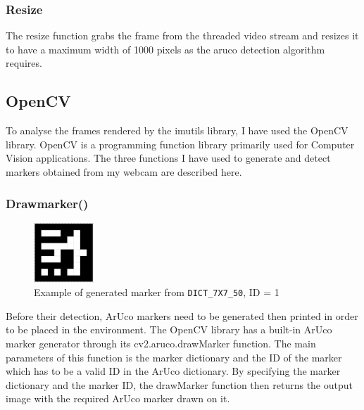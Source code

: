 \documentclass[oneside,%
                    author={Malak Hajji},
                    degree={BSc},
                    title={Designing An Accessible Computational Toolkit For Students},
                  subtitle={With Mixed Visual Abilities}]{dissertation}
\begin{document}
\subsubsection{Resize}
The resize function grabs the frame from the threaded video stream and resizes it to have a maximum width of 1000 pixels as the aruco detection algorithm requires.

\subsection{OpenCV}
To analyse the frames rendered by the imutils library, I have used the OpenCV library. OpenCV is a programming function library primarily used for Computer Vision applications. The three functions I have used to generate and detect markers obtained from my webcam are described here. 

\subsubsection{Drawmarker()}
\FloatBarrier
\begin{figure}[h]
    \centering
    \includegraphics[width=0.2\textwidth]{thesis/marker.eps}
    \caption{Example of generated marker from  \texttt{DICT\_7X7\_50}, ID = 1}
    \label{fig-marker}
\end{figure}
\FloatBarrier
Before their detection, ArUco markers need to be generated then printed in order to be placed in the environment. The OpenCV library has a built-in ArUco marker generator through its cv2.aruco.drawMarker function. The main parameters of this function is the marker dictionary and the ID of the marker which has to be a valid ID in the ArUco dictionary. By specifying the marker dictionary and the marker ID, the drawMarker function then returns the output image with the required ArUco marker drawn on it. 
\end{document}
